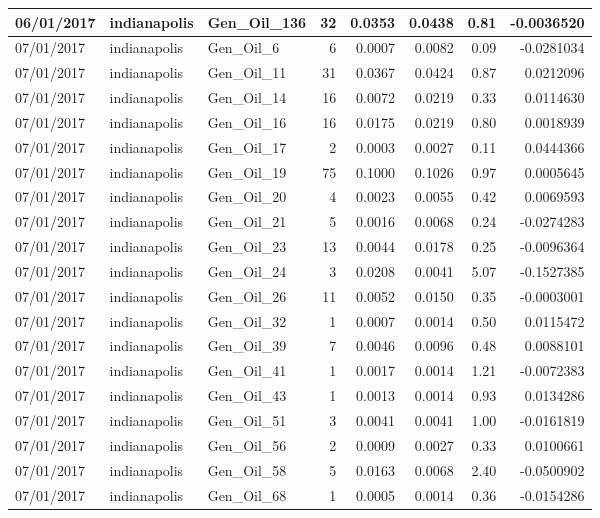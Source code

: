 \documentclass[
  letterpaper,
  DIV=11,
  numbers=noendperiod]{scrartcl}
\begin{document}
\begin{tabular}{l|l|l|r|r|r|r|r}
\hline
06/01/2017 & indianapolis & Gen\_Oil\_136 & 32 & 0.0353 & 0.0438 & 0.81 & -0.0036520\\
\hline
07/01/2017 & indianapolis & Gen\_Oil\_6 & 6 & 0.0007 & 0.0082 & 0.09 & -0.0281034\\
\hline
07/01/2017 & indianapolis & Gen\_Oil\_11 & 31 & 0.0367 & 0.0424 & 0.87 & 0.0212096\\
\hline
07/01/2017 & indianapolis & Gen\_Oil\_14 & 16 & 0.0072 & 0.0219 & 0.33 & 0.0114630\\
\hline
07/01/2017 & indianapolis & Gen\_Oil\_16 & 16 & 0.0175 & 0.0219 & 0.80 & 0.0018939\\
\hline
07/01/2017 & indianapolis & Gen\_Oil\_17 & 2 & 0.0003 & 0.0027 & 0.11 & 0.0444366\\
\hline
07/01/2017 & indianapolis & Gen\_Oil\_19 & 75 & 0.1000 & 0.1026 & 0.97 & 0.0005645\\
\hline
07/01/2017 & indianapolis & Gen\_Oil\_20 & 4 & 0.0023 & 0.0055 & 0.42 & 0.0069593\\
\hline
07/01/2017 & indianapolis & Gen\_Oil\_21 & 5 & 0.0016 & 0.0068 & 0.24 & -0.0274283\\
\hline
07/01/2017 & indianapolis & Gen\_Oil\_23 & 13 & 0.0044 & 0.0178 & 0.25 & -0.0096364\\
\hline
07/01/2017 & indianapolis & Gen\_Oil\_24 & 3 & 0.0208 & 0.0041 & 5.07 & -0.1527385\\
\hline
07/01/2017 & indianapolis & Gen\_Oil\_26 & 11 & 0.0052 & 0.0150 & 0.35 & -0.0003001\\
\hline
07/01/2017 & indianapolis & Gen\_Oil\_32 & 1 & 0.0007 & 0.0014 & 0.50 & 0.0115472\\
\hline
07/01/2017 & indianapolis & Gen\_Oil\_39 & 7 & 0.0046 & 0.0096 & 0.48 & 0.0088101\\
\hline
07/01/2017 & indianapolis & Gen\_Oil\_41 & 1 & 0.0017 & 0.0014 & 1.21 & -0.0072383\\
\hline
07/01/2017 & indianapolis & Gen\_Oil\_43 & 1 & 0.0013 & 0.0014 & 0.93 & 0.0134286\\
\hline
07/01/2017 & indianapolis & Gen\_Oil\_51 & 3 & 0.0041 & 0.0041 & 1.00 & -0.0161819\\
\hline
07/01/2017 & indianapolis & Gen\_Oil\_56 & 2 & 0.0009 & 0.0027 & 0.33 & 0.0100661\\
\hline
07/01/2017 & indianapolis & Gen\_Oil\_58 & 5 & 0.0163 & 0.0068 & 2.40 & -0.0500902\\
\hline
07/01/2017 & indianapolis & Gen\_Oil\_68 & 1 & 0.0005 & 0.0014 & 0.36 & -0.0154286\\

\end{tabular}
\end{document}
